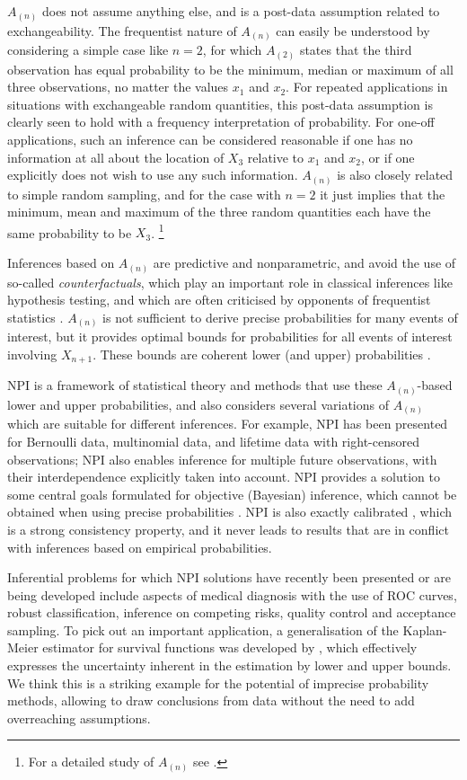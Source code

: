 $A_{(n)}$ does not assume anything else, and is a post-data assumption related to exchangeability.
The frequentist nature of $A_{(n)}$ can easily be understood by considering a simple case like $n=2$,
for which $A_{(2)}$ states that the third observation has equal probability
to be the minimum, median or maximum of all three observations, no matter the values $x_1$ and $x_2$.
For repeated applications in situations with exchangeable random quantities,
this post-data assumption is clearly seen to hold with a frequency interpretation of probability.
For one-off applications, such an inference can be considered reasonable
if one has no information at all about the location of $X_3$ relative to $x_1$ and $x_2$,
or if one explicitly does not wish to use any such information.
$A_{(n)}$ is also closely related to simple random sampling,
and for the case with $n=2$ it just implies that the minimum, mean and maximum of the three random quantities
each have the same probability to be $X_3$.%
\footnote{For a detailed study of $A_{(n)}$ see \textcite{1988:hill}.}

Inferences based on $A_{(n)}$ are predictive and nonparametric,
and avoid the use of so-called \emph{counterfactuals},
which play an important role in classical inferences like hypothesis testing,
and which are often criticised by opponents of frequentist statistics
\parencite[see, e.g.,][]{2000:dawid}.
$A_{(n)}$ is not sufficient to derive precise probabilities for many events of interest,
but it provides optimal bounds for probabilities for all events of interest involving $X_{n+1}$.
These bounds are coherent lower (and upper) probabilities \parencite{2004:augustin}.

NPI is a framework of statistical theory and methods that use these $A_{(n)}$-based lower and upper probabilities,
and also considers several variations of $A_{(n)}$ which are suitable for different inferences.
For example, NPI has been presented for Bernoulli data, multinomial data, and lifetime data with right-censored observations;
NPI also enables inference for multiple future observations, with their interdependence explicitly taken into account.
NPI provides a solution to some central goals formulated for objective (Bayesian) inference,
which cannot be obtained when using precise probabilities \parencite{2006b:Coolen}.
NPI is also exactly calibrated \parencite{2005:lawless}, which is a strong consistency property,
and it never leads to results that are in conflict with inferences based on empirical probabilities.

Inferential problems for which NPI solutions have recently been presented or are being developed
include aspects of medical diagnosis with the use of ROC curves, 
robust classification, inference on competing risks, quality control and acceptance sampling.
To pick out an important application, %
a generalisation of the Kaplan-Meier estimator for survival functions \parencite{1958:kaplan}
was developed by \textcite{2004:Coolen:Yan},
which effectively expresses the uncertainty inherent in the estimation by lower and upper bounds.
We think this is a striking example for the potential of imprecise probability methods,
allowing to draw conclusions from data without the need to add overreaching assumptions.

